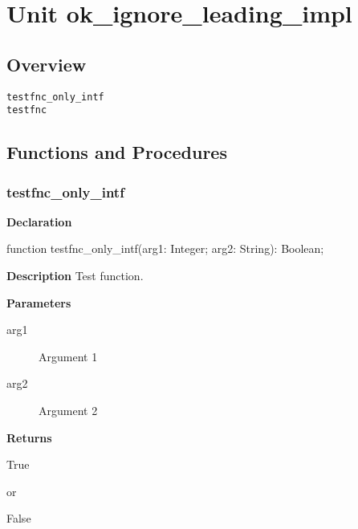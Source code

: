 \documentclass{report}
\newif\ifpdf
\begin{document}
\label{toc}\tableofcontents
\newpage
\newlength{\tmplength}
\chapter{Unit ok{\_}ignore{\_}leading{\_}impl}
\label{ok_ignore_leading_impl}
\section{Overview}
\begin{description}
\item[\texttt{testfnc{\_}only{\_}intf}]
\item[\texttt{testfnc}]
\end{description}
\section{Functions and Procedures}
\ifpdf
\subsection*{\large{\textbf{testfnc{\_}only{\_}intf}}\normalsize\hspace{1ex}\hrulefill}
\else
\subsection*{testfnc{\_}only{\_}intf}
\fi
\label{ok_ignore_leading_impl-testfnc_only_intf}
\begin{list}{}{
\setlength{\itemindent}{0cm}
\setlength{\listparindent}{0cm}
\setlength{\leftmargin}{\evensidemargin}
\addtolength{\leftmargin}{\tmplength}
\settowidth{\labelsep}{X}
\addtolength{\leftmargin}{\labelsep}
\setlength{\labelwidth}{\tmplength}
}
\item[\textbf{Declaration}\hfill]
\ifpdf
\begin{flushleft}
\fi
\begin{ttfamily}
function testfnc{\_}only{\_}intf(arg1: Integer; arg2: String): Boolean;\end{ttfamily}

\ifpdf
\end{flushleft}
\fi

\par
\item[\textbf{Description}]
Test function.

  \par
\item[\textbf{Parameters}]
\begin{description}
\item[arg1] Argument 1
\item[arg2] Argument 2
\end{description}
\item[\textbf{Returns}]\begin{ttfamily}True\end{ttfamily} or \begin{ttfamily}False\end{ttfamily}


\end{list}
\ifpdf
\end{document}
